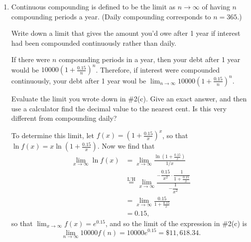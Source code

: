 \documentclass{article}
\begin{document}
\begin{enumerate}
\begin{enumerate}
    \begin{solution}
      In 1 year, your debt increased from \$10,000 to \$11,617.98, a
      percent change of \[\dfrac{11617.98 - 10000}{10000} \boxed{\approx
        16.18\%}. \]
    \end{solution}

  \item
\begin{problem}[\vfill]
      Continuous compounding is defined to be the limit as $n \to \infty$
      of having $n$ compounding periods a year.  (Daily compounding
      corresponds to $n = 365$.) 

      Write down a limit that
      gives the amount you'd owe after 1 year if interest had been
      compounded continuously rather than daily.
    \end{problem}

    \begin{solution} %
      If there were $n$ compounding periods in a year, then your debt
      after 1 year would be $10000 (1 + \frac{0.15}{n})^n$.  Therefore, if
      interest were compounded continuously, your debt after 1 year woul
      be $\boxed{ \lim_{n \to \infty} 10000 \left( 1 + \frac{0.15}{n}
        \right)^n}$.
    \end{solution}

  \calcitem
\begin{problem}[\stretch{4}]
      Evaluate the limit you wrote down in
      {{{{\#2}}(c)}}.  Give an exact answer, and
      then use a calculator find the decimal value to the nearest cent. Is this very different from compounding daily?
    \end{problem}

    \begin{solution}
        To determine this limit, let $f(x) = \left( 1 + \frac{0.15}{x}
        \right)^x$, so that $\ln f(x) = x \ln \left( 1 + \frac{0.15}{x}
        \right)$. Now we find that      
        \begin{align*}
          \lim_{x \to \infty} \ln f(x) &= \lim_{x \to \infty} \frac{\ln \left( 1 + \frac{0.15}{x} \right)}{1/x} \\
          &\overset{\text{L'H}}{=} \lim_{x \to \infty} \frac{-\dfrac{0.15}{x^2} \cdot \dfrac{1}{1 + \frac{0.15}{x}}}{-\dfrac{1}{x^2}} \\
          &= \lim_{x \to \infty} \frac{0.15}{1 + \frac{0.15}{x}} \\
          &= 0.15,
        \end{align*}      
        so that $\lim_{x \to \infty} f(x) = e^{0.15}$, and so the limit of the expression in {{{{\#2}}(c)}} is        
        \begin{equation*}
          \lim_{n \to \infty} 10000 f(n) = 10000 e^{0.15} = \boxed{\$ 11,618.34}.
        \end{equation*}
      

\end{solution}
\end{enumerate}
\end{enumerate}
\end{document}
